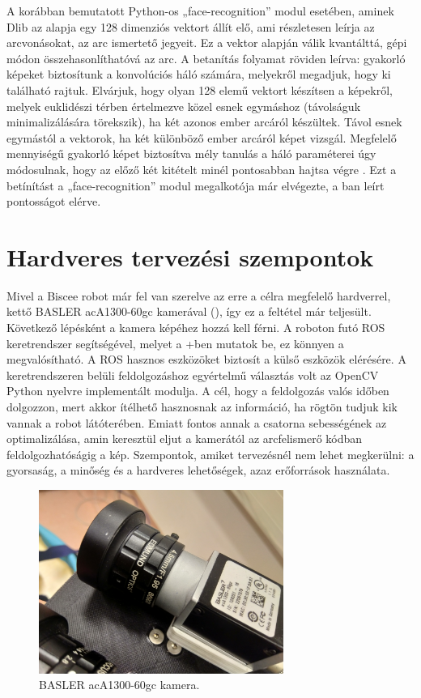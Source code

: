 A korábban bemutatott Python-os „face-recognition” modul esetében, aminek Dlib az alapja egy 128 dimenziós vektort állít elő, ami részletesen leírja az arcvonásokat, az arc ismertető jegyeit. Ez a vektor alapján válik kvantálttá, gépi módon összehasonlíthatóvá az arc. A betanítás folyamat röviden leírva: gyakorló képeket biztosítunk a konvolúciós háló számára, melyekről megadjuk, hogy ki található rajtuk. Elvárjuk, hogy olyan 128 elemű vektort készítsen a képekről, melyek euklidészi térben értelmezve közel esnek egymáshoz (távolságuk minimalizálására törekszik), ha két azonos ember arcáról készültek. Távol esnek egymástól a vektorok, ha két különböző ember arcáról képet vizsgál. Megfelelő mennyiségű gyakorló képet biztosítva mély tanulás a háló paraméterei úgy módosulnak, hogy az előző két kitételt minél pontosabban hajtsa végre \cite{artc_gold}. Ezt a betínítást a „face-recognition” modul megalkotója már elvégezte, a ban leírt pontosságot elérve.

\clearpage %
\section{Hardveres tervezési szempontok}
\label{sec:sec-cam}
Mivel a Biscee robot már fel van szerelve az erre a célra megfelelő hardverrel, kettő BASLER acA1300-60gc kamerával (), így ez a feltétel már teljesült. Következő lépésként a kamera képéhez hozzá kell férni. A roboton futó ROS keretrendszer segítségével, melyet a \az+ben mutatok be, ez könnyen a megvalósítható. A ROS hasznos eszközöket biztosít a külső eszközök elérésére. A keretrendszeren belüli feldolgozáshoz egyértelmű választás volt az OpenCV Python nyelvre implementált modulja. A cél, hogy a feldolgozás valós időben dolgozzon, mert akkor ítélhető hasznosnak az információ, ha rögtön tudjuk kik vannak a robot látóterében. Emiatt fontos annak a csatorna sebességének az optimalizálása, amin keresztül eljut a kamerától az arcfelismerő kódban feldolgozhatóságig a kép. Szempontok, amiket tervezésnél nem lehet megkerülni: a gyorsaság, a minőség és a hardveres lehetőségek, azaz erőforrások használata.

\begin{figure}[!ht]
    \centering
    \includegraphics[width=80mm, angle=180, keepaspectratio]{03_images/kamera1.jpg}
    \caption{BASLER acA1300-60gc kamera.}
    \label{fig:cam}
\end{figure}

